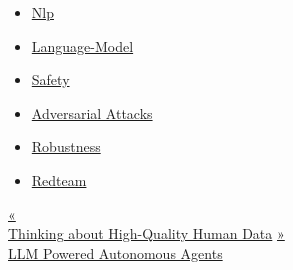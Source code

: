 \begin{itemize}
\tightlist
\item
  \href{https://lilianweng.github.io/tags/nlp/}{Nlp}
\item
  \href{https://lilianweng.github.io/tags/language-model/}{Language-Model}
\item
  \href{https://lilianweng.github.io/tags/safety/}{Safety}
\item
  \href{https://lilianweng.github.io/tags/adversarial-attacks/}{Adversarial Attacks}
\item
  \href{https://lilianweng.github.io/tags/robustness/}{Robustness}
\item
  \href{https://lilianweng.github.io/tags/redteam/}{Redteam}
\end{itemize}

\href{https://lilianweng.github.io/posts/2024-02-05-human-data-quality/}{{« }\\
{Thinking about High-Quality Human Data}} \href{https://lilianweng.github.io/posts/2023-06-23-agent/}{{ »}\\
{LLM Powered Autonomous Agents}}

